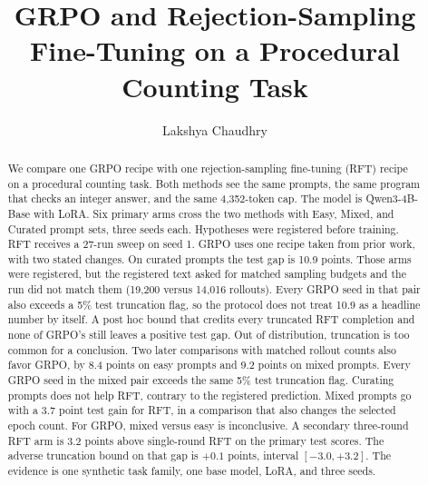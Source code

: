 \usepackage[hyphens]{url}
\usepackage{graphicx}
\def\UrlFont{\rm}
\usepackage{natbib}
\usepackage{caption}
\frenchspacing
\usepackage{booktabs}
\setcounter{secnumdepth}{2}

\title{GRPO and Rejection-Sampling Fine-Tuning on a Procedural Counting Task}
\author{Lakshya Chaudhry}


\maketitle

\begin{abstract}
We compare one GRPO recipe with one rejection-sampling fine-tuning (RFT) recipe on a procedural counting task. Both methods see the same prompts, the same program that checks an integer answer, and the same 4,352-token cap. The model is Qwen3-4B-Base with LoRA. Six primary arms cross the two methods with Easy, Mixed, and Curated prompt sets, three seeds each. Hypotheses were registered before training. RFT receives a 27-run sweep on seed 1. GRPO uses one recipe taken from prior work, with two stated changes. On curated prompts the test gap is 10.9 points. Those arms were registered, but the registered text asked for matched sampling budgets and the run did not match them (19,200 versus 14,016 rollouts). Every GRPO seed in that pair also exceeds a 5\% test truncation flag, so the protocol does not treat 10.9 as a headline number by itself. A post hoc bound that credits every truncated RFT completion and none of GRPO's still leaves a positive test gap. Out of distribution, truncation is too common for a conclusion. Two later comparisons with matched rollout counts also favor GRPO, by 8.4 points on easy prompts and 9.2 points on mixed prompts. Every GRPO seed in the mixed pair exceeds the same 5\% test truncation flag. Curating prompts does not help RFT, contrary to the registered prediction. Mixed prompts go with a 3.7 point test gain for RFT, in a comparison that also changes the selected epoch count. For GRPO, mixed versus easy is inconclusive. A secondary three-round RFT arm is 3.2 points above single-round RFT on the primary test scores. The adverse truncation bound on that gap is $+0.1$ points, interval $[-3.0, +3.2]$. The evidence is one synthetic task family, one base model, LoRA, and three seeds.
\end{abstract}

